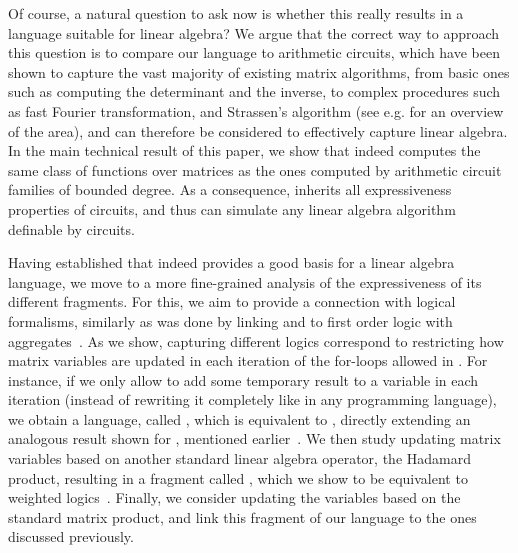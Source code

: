 Of course, a natural question to ask now is whether this really results in a language suitable for linear algebra? We argue that the correct way to approach this question is to compare our language to arithmetic circuits, which have been shown to capture the vast majority of existing matrix algorithms, from basic ones such as computing the determinant and the inverse, to complex procedures such as fast Fourier transformation, and Strassen's algorithm (see e.g. \cite{ShpilkaY10,allender} for an overview of the area), and can therefore be considered to effectively capture linear algebra. In the main technical result of this paper, we show that \langfor indeed computes the same class of functions over matrices as the ones computed by arithmetic circuit families of bounded degree.  As a consequence, \langfor inherits all expressiveness properties of circuits, and thus can simulate any linear algebra algorithm definable by circuits.

Having established that \langfor indeed provides a good basis for a linear algebra language, we move to a more fine-grained analysis of the expressiveness of its different fragments. For this, we aim to provide a connection with logical formalisms, similarly as was done by linking \lara and \lang to first order logic with aggregates~\cite{BarceloH0S20,matlang-journal}. As we show, capturing different logics correspond to restricting how matrix variables are updated in each iteration of the for-loops allowed in \langfor. For instance, if we only allow to add some temporary result to a variable in each iteration (instead of rewriting it completely like in any programming language), we obtain a language, called \langsum, which is equivalent to \rak, directly extending an analogous result shown for \lang, mentioned earlier~\cite{brijder2019matrices}. We then study updating matrix variables based on another standard linear algebra operator, the Hadamard product, resulting in a fragment called \langprod, which we show to be equivalent to weighted logics~\cite{DrosteG05}. Finally, we consider updating the variables based on the standard matrix product, and link this fragment of our language to the ones discussed 
previously.  

